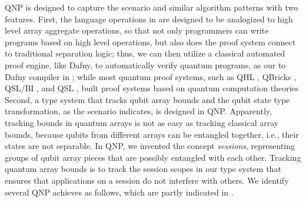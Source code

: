 QNP is designed to capture the scenario and similar algorithm patterns with two features. First, the language operations in \qafny are designed to be analogized to high level array aggregate operations, so that not only programmers can write programs based on high level operations, but also does the \qafny proof system connect to traditional separation logic; thus, we can then utilize a classical automated proof engine, like Dafny, to automatically verify quantum programs, as our \qafny to Dafny compiler in ;
while most quantum proof systems, such as QHL \cite{qhoreusage}, QBricks \cite{qbricks},  QSL/BI \cite{qsepa}, and QSL \cite{quantumseparation}, built proof systems based on quantum computation theories
Second, a type system that tracks qubit array bounds and the qubit state type transformation, as the scenario indicates, is designed in QNP. Apparently, tracking bounds in quantum arrays is not as easy as tracking classical array bounds, because qubits from different arrays can be entangled together, i.e., their states are not separable. In QNP, we invented the concept \emph{sessions}, representing groups of qubit array pieces that are possibly entangled with each other. Tracking quantum array bounds is to track the session scopes in our type system that ensures that applications on a session do not interfere with others. 
We identify several QNP achieves  as follows, which are partly indicated in .
